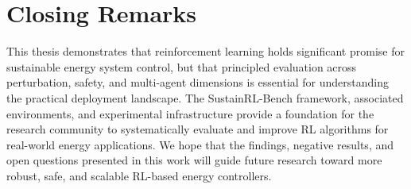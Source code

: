 \section{Closing Remarks}
\label{sec:closing}

This thesis demonstrates that reinforcement learning holds significant promise for sustainable energy system control, but that principled evaluation across perturbation, safety, and multi-agent dimensions is essential for understanding the practical deployment landscape. The SustainRL-Bench framework, associated environments, and experimental infrastructure provide a foundation for the research community to systematically evaluate and improve RL algorithms for real-world energy applications. We hope that the findings, negative results, and open questions presented in this work will guide future research toward more robust, safe, and scalable RL-based energy controllers.
